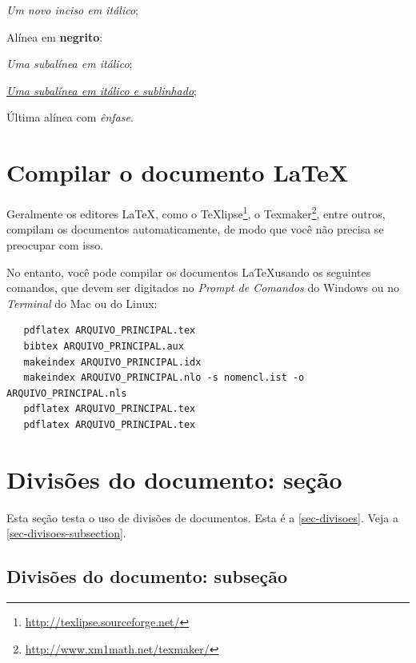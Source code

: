 \documentclass[
	12pt,				%
	openright,			%
	oneside,			    %
	a4paper,				%
	english,			%
	french,			%
	spanish,			%
	brazil			%
	]{abntex2}
\begin{document}
\begin{alineas}
  \begin{incisos}
    \item \textit{Um novo inciso em itálico};
  \end{incisos}
  
  \item Alínea em \textbf{negrito}:
  
  \begin{subalineas}
    \item \textit{Uma subalínea em itálico};
    \item \underline{\textit{Uma subalínea em itálico e sublinhado}}; 
  \end{subalineas}
  
  \item Última alínea com \emph{ênfase}.
  
\end{alineas}


\section{Compilar o documento \LaTeX}

Geralmente os editores \LaTeX, como o
TeXlipse\footnote{\url{http://texlipse.sourceforge.net/}}, o
Texmaker\footnote{\url{http://www.xm1math.net/texmaker/}}, entre outros,
compilam os documentos automaticamente, de modo que você não precisa se
preocupar com isso.

No entanto, você pode compilar os documentos \LaTeX usando os seguintes
comandos, que devem ser digitados no \emph{Prompt de Comandos} do Windows ou no
\emph{Terminal} do Mac ou do Linux:

\begin{verbatim}
   pdflatex ARQUIVO_PRINCIPAL.tex
   bibtex ARQUIVO_PRINCIPAL.aux
   makeindex ARQUIVO_PRINCIPAL.idx 
   makeindex ARQUIVO_PRINCIPAL.nlo -s nomencl.ist -o ARQUIVO_PRINCIPAL.nls
   pdflatex ARQUIVO_PRINCIPAL.tex
   pdflatex ARQUIVO_PRINCIPAL.tex
\end{verbatim}



\section{Divisões do documento: seção}\label{sec-divisoes}


Esta seção testa o uso de divisões de documentos. Esta é a
\autoref{sec-divisoes}. Veja a \autoref{sec-divisoes-subsection}.

\subsection{Divisões do documento: subseção}\label{sec-divisoes-subsection}
\end{document}
